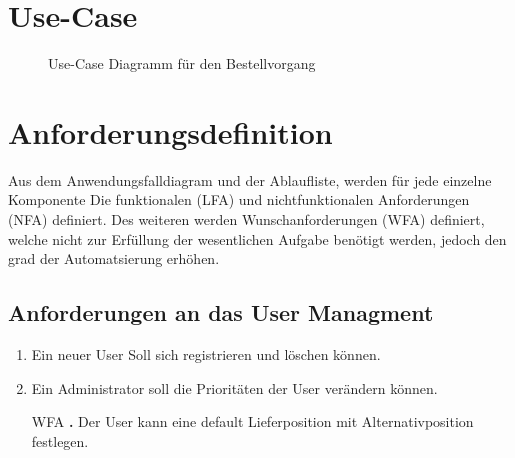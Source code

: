 \section{Use-Case}
\begin{figure}[!ht]
\caption{Use-Case Diagramm für den Bestellvorgang}
\label{fig:use-case}
\end{figure}

\section{Anforderungsdefinition}
Aus dem Anwendungsfalldiagram und der Ablaufliste, werden für jede einzelne Komponente Die funktionalen (LFA) und nichtfunktionalen Anforderungen (NFA) definiert.
Des weiteren werden Wunschanforderungen (WFA) definiert, welche nicht zur Erfüllung der wesentlichen Aufgabe benötigt werden, jedoch den grad der Automatsierung erhöhen.%

\subsection{Anforderungen an das User Managment}
\begin{enumerate}[nosep,style=sameline]
\renewcommand{\labelenumi}{ULFA \textbf{\theenumi.}}
\item Ein neuer User Soll sich registrieren und löschen können.
\item Ein Administrator soll die Prioritäten der User verändern können.
\item[WFA \textbf{\theenumi.}] Der User kann eine default Lieferposition mit Alternativposition festlegen.
\end{enumerate}


